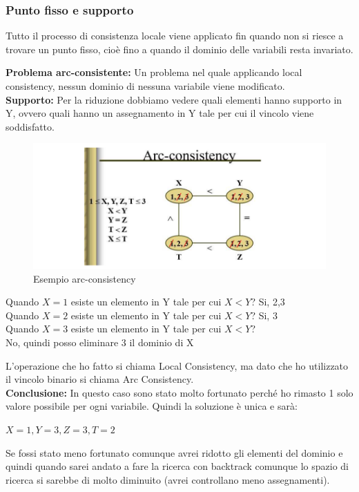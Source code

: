\subsubsection{Punto fisso e supporto}
Tutto il processo di consistenza locale viene applicato fin quando non si riesce
a trovare un punto fisso, cioè fino a quando il dominio delle variabili resta
invariato.
\vspace{0.5cm}

\textbf{Problema arc-consistente:} Un problema nel quale applicando local
consistency, nessun dominio di nessuna variabile viene modificato. \\
\noindent \textbf{Supporto:} Per la riduzione dobbiamo vedere quali elementi
hanno supporto in Y, ovvero quali hanno un assegnamento in Y tale per cui il
vincolo viene soddisfatto.
\begin{figure}[htp]
    \centering
    \includegraphics[width=13cm, keepaspectratio]{img/Cap3/esempio-arc.png}
    \caption{Esempio arc-consistency}
\end{figure}
\begin{center}
    Quando $X=1$ esiste un elemento in Y tale per cui $X < Y$? Si, 2,3 \\Quando
    $X=2$ esiste un elemento in Y tale per cui $X < Y$? Si, 3 \\Quando $X=3$
    esiste un elemento in Y tale per cui $X < Y$? \\No, quindi posso eliminare 3
    il dominio di X
\end{center}
L'operazione che ho fatto si chiama Local Consistency, ma dato che ho utilizzato
il vincolo binario si chiama Arc Consistency.\\

\textbf{Conclusione:} In questo caso sono stato molto fortunato perché
ho rimasto 1 solo valore possibile per ogni variabile. Quindi la soluzione è
unica e sarà:
\begin{center}
    $X = 1, Y = 3, Z = 3, T = 2$
\end{center}
Se fossi stato meno fortunato comunque avrei ridotto gli elementi del dominio e
quindi quando sarei andato a fare la ricerca con backtrack comunque lo spazio di
ricerca si sarebbe di molto diminuito (avrei controllano meno assegnamenti).\\

